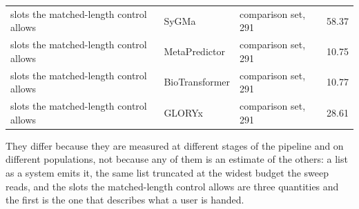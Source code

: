 \begin{table}[h]
\begin{threeparttable}
\begin{tabular}{llll}
slots the matched-length control allows & SyGMa & comparison set, 291 & 58.37 \\
slots the matched-length control allows & MetaPredictor & comparison set, 291 & 10.75 \\
slots the matched-length control allows & BioTransformer & comparison set, 291 & 10.77 \\
slots the matched-length control allows & GLORYx & comparison set, 291 & 28.61 \\
\bottomrule
\end{tabular}
\begin{tablenotes}[flushleft]\footnotesize
\item They differ because they are measured at different stages of the pipeline and on different populations, not because any of them is an estimate of the others: a list as a system emits it, the same list truncated at the widest budget the sweep reads, and the slots the matched-length control allows are three quantities and the first is the one that describes what a user is handed.
\end{tablenotes}
\end{threeparttable}
\end{table}
